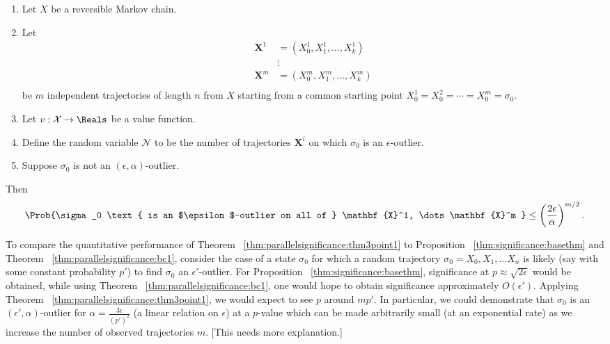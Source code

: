 \documentclass[12pt]{article}
\begin{document}
\begin{corollary}
    \label{thm:parallelsignificance:thm5}
    \begin{enumerate}
        \item
            Let \( X \) be a reversible Markov chain.
        \item
            Let
            \begin{align*}
                \mathbf{X}^1 &= (X_0^1, X_1^1, \dots, X_k^1 )\\
                &\vdots \\
                \mathbf{X}^m &= (X_0^m, X_1^m, \dots, X_k^m )\\
            \end{align*}
            be \( m \) independent trajectories of length \( n \) from \(
            X \) starting from a common starting point \( X_0^1 = X_0^2
            = \cdots = X_0^m = \sigma_0 \).
        \item
            Let \( v :  \mathcal{X} \to \Reals \) be a value function.
        \item
            Define the random variable \( \mathcal{N} \) to be the
            number of trajectories \( \mathbf{X}^i \) on which \( \sigma_0
            \) is an \( \epsilon \)-outlier.
        \item
            Suppose \( \sigma_0 \) is not an \( (\epsilon, \alpha) \)-outlier.
    \end{enumerate}
    Then
    \[
        \Prob{\sigma_0 \text{ is an $\epsilon$-outlier on all of } \mathbf
        {X}^1, \dots \mathbf{X}^m } \le \left( \frac{2\epsilon}{\alpha}
        \right)^{m/2}.
    \]

  \end{corollary}

\begin{example}
    To compare the quantitative performance of Theorem~%
    \ref{thm:parallelsignificance:thm3point1} to Proposition~%
    \ref{thm:significance:basethm} and Theorem~%
    \ref{thm:parallelsignificance:bc1}, consider the case of a state \( \sigma_0
    \) for which a random trajectory \( \sigma_0 = X_0 , X_1 , \dots X_n
    \) is likely (say with some constant probability \( p' \)) to find \(
    \sigma_0 \) an \( \epsilon' \)-outlier.  For Proposition~%
    \ref{thm:significance:basethm}, significance at \( p \approx \sqrt{2\epsilon}
    \) would be obtained, while using Theorem~%
    \ref{thm:parallelsignificance:bc1}, one would hope to obtain significance
    approximately \( O(\epsilon') \).  Applying Theorem~%
    \ref{thm:parallelsignificance:thm3point1}, we would expect to see \( p \)
    around \( m p' \).  In particular, we could demonstrate that \(
    \sigma_0 \) is an \( (\epsilon', \alpha) \)-outlier for \( \alpha =
    \frac{3\epsilon} {(p')^2} \) (a linear relation on \( \epsilon \))
    at a \( p \)-value which can be made arbitrarily small (at an
    exponential rate) as we increase the number of observed trajectories
    \( m \).  [This needs more explanation.]
\end{example}
\end{document}

